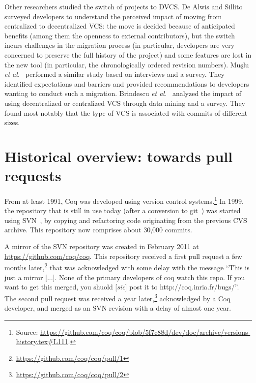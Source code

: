 Other researchers studied the switch of projects to DVCS.
De Alwis and Sillito~\cite{de2009software} surveyed developers to understand the perceived impact of moving from centralized to decentralized VCS: the move is decided because of anticipated benefits (among them the openness to external contributors), but the switch incurs challenges in the migration process (in particular, developers are very concerned to preserve the full history of the project) and some features are lost in the new tool (in particular, the chronologically ordered revision numbers).
Muşlu \emph{et al.}~\cite{mucslu2014transition} performed a similar study based on interviews and a survey. They identified expectations and barriers and provided recommendations to developers wanting to conduct such a migration.
Brindescu \emph{et al.}~\cite{brindescu2014centralized} analyzed the impact of using decentralized or centralized VCS through data mining and a survey. They found most notably that the type of VCS is associated with commits of different sizes.

\section{Historical overview: towards pull requests}

\label{sec:towards-pull-requests}

From at least 1991, Coq was developed using version control systems.\footnote{
	Source: \url{https://github.com/coq/coq/blob/5f7c88d/dev/doc/archive/versions-history.tex\#L111}.
}
In 1999, the repository that is still in use today (after a conversion to git~\cite{torvalds2005git}) was started using SVN~\cite{svn}, by copying and refactoring code originating from the previous CVS~\cite{cvs} archive. This repository now comprises about 30,000 commits.

A mirror of the SVN repository was created in February 2011 at \url{https://github.com/coq/coq}. This repository received a first pull request a few months later,\footnote{
	\url{https://github.com/coq/coq/pull/1}
} that was acknowledged with some delay with the message ``This is just a mirror [...]. None of the primary developers of coq watch this repo. If you want to get this merged, you shuold [\emph{sic}] post it to http://coq.inria.fr/bugs/''.
The second pull request was received a year later,\footnote{
	\url{https://github.com/coq/coq/pull/2}
} acknowledged by a Coq developer, and merged as an SVN revision with a delay of almost one year.

